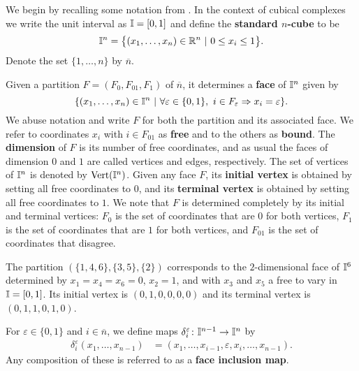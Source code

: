 We begin by recalling some notation from \cite{FMS-flows}.
In the context of cubical complexes we write the unit interval as $\mathbb{I} = [0,1]$ and define the \textbf{standard $n$-cube} to be
\begin{equation*}
	\mathbb{I}^n = \big\{ (x_1, \dots, x_n) \in \mathbb{R}^n\ |\ 0 \leq x_i \leq 1 \big\}.
\end{equation*}
Denote the set $\{1, \dots, n\}$ by $\overline{n}$.

Given a partition $F = (F_0, F_{01}, F_1)$ of $\overline n$, it determines a \textbf{face} of $\mathbb{I}^n$ given by
\begin{equation*}
	\{(x_1, \dots, x_n) \in \mathbb{I}^n\ |\ \forall \varepsilon \in \{0, 1\},\ i \in F_\varepsilon \Rightarrow x_i = \varepsilon\}.
\end{equation*}
We abuse notation and write $F$ for both the partition and its associated face.
We refer to coordinates $x_i$ with $i \in F_{01}$ as \textbf{free} and to the others as \textbf{bound}.
The \textbf{dimension} of $F$ is its number of free coordinates, and as usual the faces of dimension $0$ and $1$ are called vertices and edges, respectively.
The set of vertices of $\mathbb{I}^n$ is denoted by ${\rm Vert}(\mathbb{I}^n)$.
Given any face $F$, its \textbf{initial vertex} is obtained by setting all free coordinates to $0$, and its \textbf{terminal vertex} is obtained by setting all free coordinates to $1$.
We note that $F$ is determined completely by its initial and terminal vertices: $F_0$ is the set of coordinates that are $0$ for both vertices, $F_1$ is the set of coordinates that are $1$ for both vertices, and $F_{01}$ is the set of coordinates that disagree.

\begin{example}
	The partition $(\{1,4,6\},\{3,5\}, \{2\})$ corresponds to the $2$-dimensional face of $\mathbb{I}^6$ determined by $x_1=x_4=x_6=0$, $x_2=1$, and with $x_3$ and $x_5$ a free to vary in $\mathbb{I} = [0,1]$.
	Its initial vertex is $(0,1,0,0,0,0)$ and its terminal vertex is  $(0,1,1,0,1,0)$.
\end{example}

For $\varepsilon \in \{0, 1\}$ and $i \in \overline{n}$, we define maps $\delta_i^\varepsilon \colon \mathbb{I}^{n-1} \to \mathbb{I}^{n}$ by
\begin{align*}
	\delta_i^\varepsilon(x_1, \dots, x_{n-1}) & = (x_1, \dots, x_{i-1}, \varepsilon, x_i, \dots, x_{n-1}).
\end{align*}
Any composition of these is referred to as a \textbf{face inclusion map}.


